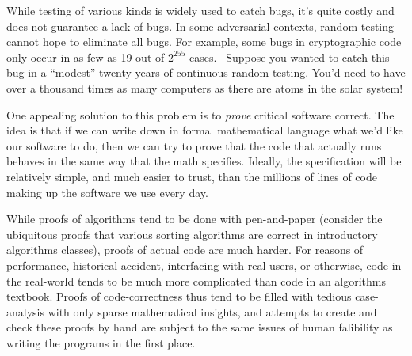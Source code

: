 While testing of various kinds is widely used to catch bugs, it's quite costly  and does not guarantee a lack of bugs.
In some adversarial contexts, random testing cannot hope to eliminate all bugs.
For example, some bugs in cryptographic code only occur in as few as 19 out of $2^{255}$ cases.~\cite{curve25519-donna-commit-correct-bounds}
Suppose you wanted to catch this bug in a ``modest'' twenty years of continuous random testing.
You'd need to have over a thousand times as many computers as there are atoms in the solar system!

One appealing solution to this problem is to \emph{prove} critical software correct.
The idea is that if we can write down in formal mathematical language what we'd like our software to do, then we can try to prove that the code that actually runs behaves in the same way that the math specifies.
Ideally, the specification will be relatively simple, and much easier to trust, than the millions of lines of code making up the software we use every day.

While proofs of algorithms tend to be done with pen-and-paper (consider the ubiquitous proofs that various sorting algorithms are correct in introductory algorithms classes), proofs of actual code are much harder.
For reasons of performance, historical accident, interfacing with real users, or otherwise, code in the real-world tends to be much more complicated than code in an algorithms textbook.
Proofs of code-correctness thus tend to be filled with tedious case-analysis with only sparse mathematical insights, and attempts to create and check these proofs by hand are subject to the same issues of human falibility as writing the programs in the first place.

